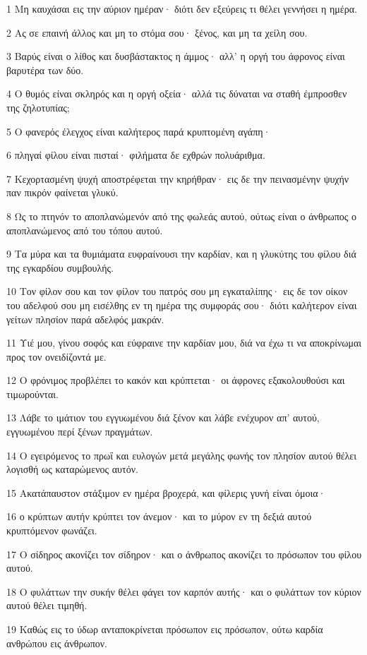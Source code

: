 \par 1 Μη καυχάσαι εις την αύριον ημέραν· διότι δεν εξεύρεις τι θέλει γεννήσει η ημέρα.
\par 2 Ας σε επαινή άλλος και μη το στόμα σου· ξένος, και μη τα χείλη σου.
\par 3 Βαρύς είναι ο λίθος και δυσβάστακτος η άμμος· αλλ' η οργή του άφρονος είναι βαρυτέρα των δύο.
\par 4 Ο θυμός είναι σκληρός και η οργή οξεία· αλλά τις δύναται να σταθή έμπροσθεν της ζηλοτυπίας;
\par 5 Ο φανερός έλεγχος είναι καλήτερος παρά κρυπτομένη αγάπη·
\par 6 πληγαί φίλου είναι πισταί· φιλήματα δε εχθρών πολυάριθμα.
\par 7 Κεχορτασμένη ψυχή αποστρέφεται την κηρήθραν· εις δε την πεινασμένην ψυχήν παν πικρόν φαίνεται γλυκύ.
\par 8 Ως το πτηνόν το αποπλανώμενόν από της φωλεάς αυτού, ούτως είναι ο άνθρωπος ο αποπλανώμενος από του τόπου αυτού.
\par 9 Τα μύρα και τα θυμιάματα ευφραίνουσι την καρδίαν, και η γλυκύτης του φίλου διά της εγκαρδίου συμβουλής.
\par 10 Τον φίλον σου και τον φίλον του πατρός σου μη εγκαταλίπης· εις δε τον οίκον του αδελφού σου μη εισέλθης εν τη ημέρα της συμφοράς σου· διότι καλήτερον είναι γείτων πλησίον παρά αδελφός μακράν.
\par 11 Υιέ μου, γίνου σοφός και εύφραινε την καρδίαν μου, διά να έχω τι να αποκρίνωμαι προς τον ονειδίζοντά με.
\par 12 Ο φρόνιμος προβλέπει το κακόν και κρύπτεται· οι άφρονες εξακολουθούσι και τιμωρούνται.
\par 13 Λάβε το ιμάτιον του εγγυωμένου διά ξένον και λάβε ενέχυρον απ' αυτού, εγγυωμένου περί ξένων πραγμάτων.
\par 14 Ο εγειρόμενος το πρωΐ και ευλογών μετά μεγάλης φωνής τον πλησίον αυτού θέλει λογισθή ως καταρώμενος αυτόν.
\par 15 Ακατάπαυστον στάξιμον εν ημέρα βροχερά, και φίλερις γυνή είναι όμοια·
\par 16 ο κρύπτων αυτήν κρύπτει τον άνεμον· και το μύρον εν τη δεξιά αυτού κρυπτόμενον φωνάζει.
\par 17 Ο σίδηρος ακονίζει τον σίδηρον· και ο άνθρωπος ακονίζει το πρόσωπον του φίλου αυτού.
\par 18 Ο φυλάττων την συκήν θέλει φάγει τον καρπόν αυτής· και ο φυλάττων τον κύριον αυτού θέλει τιμηθή.
\par 19 Καθώς εις το ύδωρ ανταποκρίνεται πρόσωπον εις πρόσωπον, ούτω καρδία ανθρώπου εις άνθρωπον.
